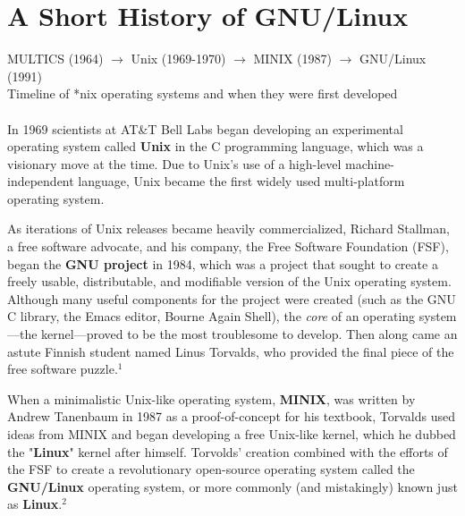 \documentclass[11pt,oneside]{article}
\newenvironment{articleSectionN}[1]
{#1}
{}
\begin{document}
\section{A Short History of GNU/Linux}
\begin{articleSectionN}
\begin{center}
    \large MULTICS (1964) $\to$ Unix (1969-1970) $\to$ MINIX (1987) $\to$ GNU/Linux (1991)\\
    \footnotesize Timeline of *nix operating systems and when they were first developed\\
\end{center}
\paragraph{}
\qquad In 1969 scientists at AT\&T Bell Labs began developing an experimental operating system called \textbf{Unix} in the C programming language, which was a visionary move at the time. Due to Unix's use of a high-level machine-independent language, Unix became the first widely used multi-platform operating system.
    
    As iterations of Unix releases became heavily commercialized, Richard Stallman, a free software advocate, and his company, the Free Software Foundation (FSF), began the \textbf{GNU project} in 1984, which was a project that sought to create a freely usable, distributable, and modifiable version of the Unix operating system. Although many useful components for the project were created (such as the GNU C library, the Emacs editor, Bourne Again Shell), the \emph{core} of an operating system---the kernel---proved to be the most troublesome to develop. Then along came an astute Finnish student named Linus Torvalds, who provided the final piece of the free software puzzle.$^{1}$

    When a minimalistic Unix-like operating system, \textbf{MINIX}, was written by Andrew Tanenbaum in 1987 as a proof-of-concept for his textbook, Torvalds used ideas from MINIX and began developing a free Unix-like kernel, which he dubbed the "\textbf{Linux}" kernel after himself. Torvolds' creation combined with the efforts of the FSF to create a revolutionary open-source operating system called the \textbf{GNU/Linux} operating system, or more commonly (and mistakingly) known just as \textbf{Linux}.$^{2}$
    
%           
   
\vspace{4pt}
\end{articleSectionN}
\end{document}
